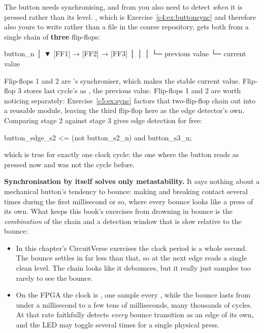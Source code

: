 The button needs synchronising, and from  you also need to detect \emph{when} it is
pressed rather than its level. , which is Exercise~\ref{c4:ex:buttonsync} and
therefore also yours to write rather than a file in the course repository, gets both from a single
chain of \textbf{three} flip-flops:

\begin{textdrawing}
button_n
   │
   ▼
[FF1] → [FF2] → [FF3]
        │        │
        │        └─ previous value
        └─ current value
\end{textdrawing}

Flip-flops 1 and 2 are 's synchroniser, which makes  the
stable current value. Flip-flop 3 stores last cycle's  as , the
previous value. Flip-flops 1 and 2 are worth noticing separately: Exercise~\ref{c5:ex:sync} factors
that two-flip-flop chain out into a reusable  module, leaving the third flip-flop here as
the edge detector's own. Comparing stage 2 against stage 3 gives edge detection for free:

\begin{vhdlcode}
button_edge_s2 <= (not button_s2_n) and button_s3_n;
\end{vhdlcode}

which is true for exactly one clock cycle: the one where the button reads as pressed now and was
not the cycle before.

\textbf{Synchronisation by itself solves only metastability.} It says nothing about a mechanical
button's tendency to bounce: making and breaking contact several times during the first millisecond
or so, where every bounce looks like a press of its own. What keeps this book's exercises from
drowning in bounce is the \emph{combination} of the chain and a detection window that is slow
relative to the bounce:
\begin{itemize}
  \item In this chapter's CircuitVerse exercises the clock period is a whole second. The bounce
    settles in far less than that, so at the next edge  reads a single clean
    level. The chain looks like it debounces, but it really just samples too rarely to see the
    bounce.
  \item On the FPGA the clock is , one sample every , while the bounce
    lasts from under a millisecond to a few tens of milliseconds, many thousands of cycles. At that
    rate  faithfully detects \emph{every} bounce transition as an edge of its own,
    and the LED may toggle several times for a single physical press.
\end{itemize}

